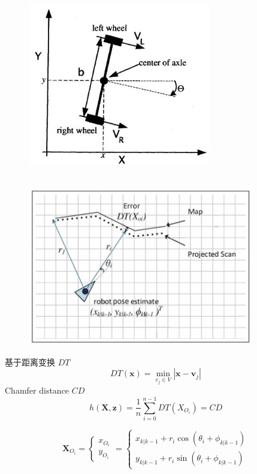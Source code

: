 \documentclass[12pt,a4paper]{article}
\newcommand{\zhiv}{\fontsize{12pt}{18pt}\selectfont}      %
\begin{document}
{{{\begin{figure}[!htb]
  \centering
  \includegraphics[height=200pt]{motion_model.jpg}
\end{figure}
{\subsection{\textbf{\song\zhiv{观测模型}}}}

\begin{figure}[!htb]
  \centering
  \includegraphics[height=200pt]{observation_model.jpg}
\end{figure}
基于距离变换 $DT$
\[
    DT(\textbf{x}) = \min_{v_j\in V}|\textbf{x}-\textbf{v}_j|
\]
Chamfer distance $CD$
\[
    h(\textbf{X},\textbf{z}) = \frac{1}{n}\sum_{i=0}^{n-1}DT(X_{O_i})=CD
\]

\[
    \textbf{X}_{O_i}=\begin{cases} x_{O_i} \\ y_{O_i} \end{cases} = 
    \begin{cases} 
    x_{k|k-1}+r_i\cos(\theta_i+\phi_{k|k-1})\\ 
    y_{k|k-1}+r_i\sin(\theta_i+\phi_{k|k-1}) 
    \end{cases}
\]

}}}
\end{document}
